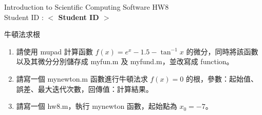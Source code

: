 \documentclass[12pt,a4paper]{article}
\newcommand{\placeholder}[1]{\textbf{$<$ #1 $>$}}
\newcommand{\idnumber}{\placeholder{Student ID}}
\begin{document}
\begin{CJK}{UTF8}{bsmi}
\begin{flushleft}Introduction to Scientific Computing Software HW8
\\Student ID : \idnumber{}\end{flushleft}

牛頓法求根
\begin{enumerate}
\item 請使用 mupad 計算函數 $f(x)=e^x-1.5-\tan^{-1}x$ 的微分，同時將該函數以及其微分分別儲存成 myfun.m 及 myfund.m，並改寫成 function。
\item 請寫一個 mynewton.m 函數進行牛頓法求 $f(x)=0$ 的根，參數：起始值、誤差、最大迭代次數，回傳值：計算結果。
\item 請寫一個 hw8.m，執行 mynewton 函數，起始點為 $x_0=-7$。

\end{enumerate}
\end{CJK}
\end{document}
